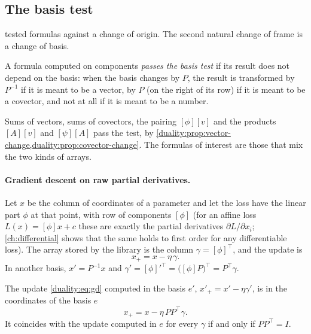 \begin{notechapter}
\section{The basis test}\label{duality:sec:basis-test}

 tested formulas against a change of origin. The
second natural change of frame is a change of basis.

\begin{definition}\label{duality:def:basis-test}
A formula computed on components \emph{passes the basis test} if its
result does not depend on the basis: when the basis changes by $P$, the
result is transformed by $P^{-1}$ if it is meant to be a vector, by $P$
(on the right of its row) if it is meant to be a covector, and not at all
if it is meant to be a number.
\end{definition}

Sums of vectors, sums of covectors, the pairing $[\phi][v]$ and the
products $[A][v]$ and $[\psi][A]$ pass the test, by
\cref{duality:prop:vector-change,duality:prop:covector-change}. The
formulas of interest are those that mix the two kinds of arrays.

\paragraph{Gradient descent on raw partial derivatives.} Let $x$ be the
column of coordinates of a parameter and let the loss have the linear part
$\phi$ at that point, with row of components $[\phi]$ (for an affine loss
$L(x) = [\phi]x + c$ these are exactly the partial derivatives
$\partial L/\partial x_i$; \cref{ch:differential} shows that the same
holds to first order for any differentiable loss). The array stored by the
library is the column $\gamma = [\phi]^\top$, and the update is
\begin{equation}\label{duality:eq:gd}
  x_+ = x - \eta\,\gamma .
\end{equation}
In another basis, $x' = P^{-1}x$ and
$\gamma' = [\phi]'^\top = \bigl([\phi]P\bigr)^\top = P^\top\gamma$.

\begin{proposition}
\label{duality:prop:gd}
The update \eqref{duality:eq:gd} computed in the basis $e'$,
$x'_+ = x' - \eta\gamma'$, is in the coordinates of the basis $e$
\[
  x_+ = x - \eta\,PP^\top\gamma .
\]
It coincides with the update computed in $e$ for every $\gamma$ if and
only if $PP^\top = I$.
\end{proposition}


\end{notechapter}
